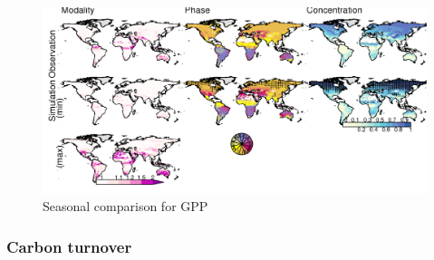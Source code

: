 \begin{figure}[t]
    \includegraphics[width=12cm]{figs/GPP/fire_var_seasonality-maps-MPCcontrol-gpp.png}
    \caption{Seasonal comparison for GPP \label{fig:GPPseasonalMap}}
\end{figure}


\subsubsection{Carbon turnover}

